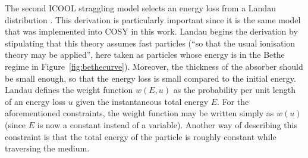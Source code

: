 \label{ssc:ICOOLStragglingLandau}
The second ICOOL straggling model selects an energy loss from a Landau distribution \cite{landau}. This derivation is particularly important since it is the same model that was implemented into COSY in this work. Landau begins the derivation by stipulating that this theory assumes fast particles (``so that the usual ionisation theory may be applied'', here taken as particles whose energy is in the Bethe regime in Figure~\ref{fig:bethecurve}). Moreover, the thickness of the absorber should be small enough, so that the energy loss is small compared to the initial energy. Landau defines the weight function $w(E,u)$ as the probability per unit length of an energy loss $u$ given the instantaneous total energy $E$. For the aforementioned constraints, the weight function may be written simply as $w(u)$ (since $E$ is now a constant instead of a variable). Another way of describing this constraint is that the total energy of the particle is roughly constant while traversing the medium.

